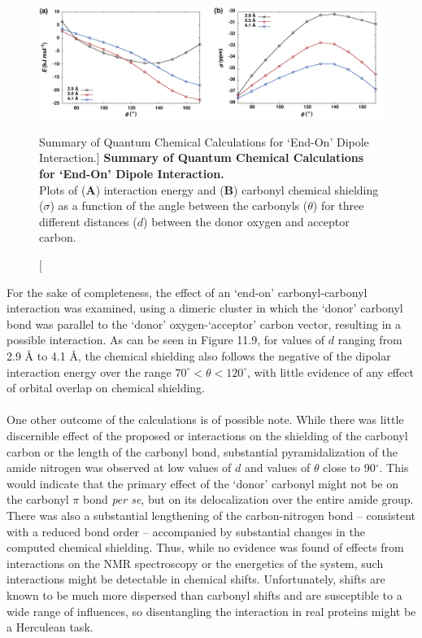 \begin{figure}[h!]
\includegraphics[width=6.5in]{figs/npistar/09-curves.png}
\caption
   [Summary of Quantum Chemical Calculations for `End-On' Dipole Interaction.]
  {{\bf
    Summary of Quantum Chemical Calculations for `End-On' Dipole Interaction.
  }
  \\
  Plots of ({\bf A}) interaction energy and ({\bf B}) carbonyl \cnmr{} chemical
  shielding ($\sigma$) as a function of the angle between the carbonyls
  ($\theta$) for three different distances ($d$) between the donor oxygen
  and acceptor carbon.
}
\end{figure}

\begin{doublespace}
For the sake of completeness, the effect of an `end-on' carbonyl-carbonyl
interaction was examined, using a dimeric cluster in which the `donor' carbonyl
bond was parallel to the `donor' oxygen-`acceptor' carbon vector, resulting in
a possible \nspistar{} interaction. As can be seen in Figure 11.9, for values
of $d$ ranging from 2.9 \r{A} to 4.1 \r{A}, the chemical shielding also follows
the negative of the dipolar interaction energy over the range
$70^\circ < \theta < 120^\circ$, with little evidence of any effect of orbital
overlap on chemical shielding.
\\\\
One other outcome of the calculations is of possible note. While there was
little discernible effect of the proposed \nspistar{} or \npipistar{}
interactions on the shielding of the carbonyl carbon or the length of the
carbonyl bond, substantial pyramidalization of the amide nitrogen was observed
at low values of $d$ and values of $\theta$ close to 90$^\circ$. This would
indicate that the primary effect of the `donor' carbonyl might not be on the
carbonyl $\pi$ bond \emph{per se}, but on its delocalization over the entire
amide group. There was also a substantial lengthening of the carbon-nitrogen
bond -- consistent with a reduced bond order -- accompanied by substantial
changes in the computed \nnmr{} chemical shielding. Thus, while no evidence
was found of effects from \nspistar{} interactions on the \cnmr{} NMR
spectroscopy or the energetics of the system, such interactions might be
detectable in \nnmr{} chemical shifts. Unfortunately, \nnmr{} shifts are known
to be much more dispersed than carbonyl \cnmr{} shifts and are susceptible to
a wide range of influences, so disentangling the interaction in real proteins
might be a Herculean task.
\end{doublespace}

